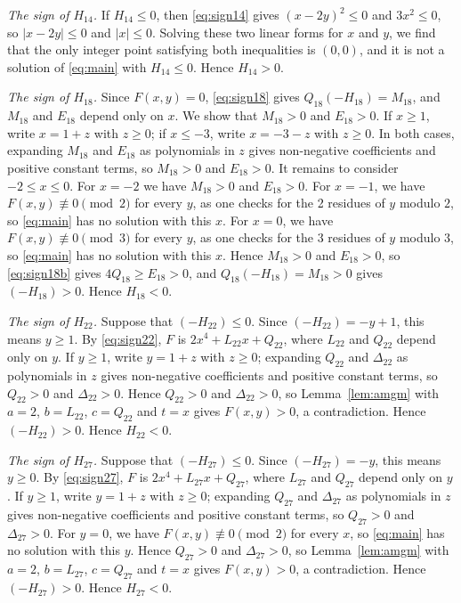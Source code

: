 \documentclass[11pt]{article}
\begin{document}
\emph{The sign of $H_{14}$.} If $H_{14}\leq0$, then \eqref{eq:sign14} gives $(x-2y)^2\leq 0$ and $3x^2\leq 0$, so $|x-2y|\leq0$ and $|x|\leq0$. Solving these two linear forms for $x$ and $y$, we find that the only integer point satisfying both inequalities is $(0,0)$, and it is not a solution of \eqref{eq:main} with $H_{14}\leq0$. Hence $H_{14}>0$.

\emph{The sign of $H_{18}$.} Since $F(x,y)=0$, \eqref{eq:sign18} gives $Q_{18}(-H_{18})=M_{18}$, and $M_{18}$ and $E_{18}$ depend only on $x$. We show that $M_{18}>0$ and $E_{18}>0$. If $x\geq1$, write $x=1+z$ with $z\geq0$; if $x\leq-3$, write $x=-3-z$ with $z\geq0$. In both cases, expanding $M_{18}$ and $E_{18}$ as polynomials in $z$ gives non-negative coefficients and positive constant terms, so $M_{18}>0$ and $E_{18}>0$. It remains to consider $-2\leq x\leq0$. For $x=-2$ we have $M_{18}>0$ and $E_{18}>0$. For $x=-1$, we have $F(x,y)\not\equiv0\pmod{2}$ for every $y$, as one checks for the 2 residues of $y$ modulo $2$, so \eqref{eq:main} has no solution with this $x$. For $x=0$, we have $F(x,y)\not\equiv0\pmod{3}$ for every $y$, as one checks for the 3 residues of $y$ modulo $3$, so \eqref{eq:main} has no solution with this $x$. Hence $M_{18}>0$ and $E_{18}>0$, so \eqref{eq:sign18b} gives $4Q_{18}\geq E_{18}>0$, and $Q_{18}(-H_{18})=M_{18}>0$ gives $(-H_{18})>0$. Hence $H_{18}<0$.

\emph{The sign of $H_{22}$.} Suppose that $(-H_{22})\leq0$. Since $(-H_{22})=-y+1$, this means $y\geq1$. By \eqref{eq:sign22}, $F$ is $2x^4+L_{22}x+Q_{22}$, where $L_{22}$ and $Q_{22}$ depend only on $y$. If $y\geq1$, write $y=1+z$ with $z\geq0$; expanding $Q_{22}$ and $\Delta_{22}$ as polynomials in $z$ gives non-negative coefficients and positive constant terms, so $Q_{22}>0$ and $\Delta_{22}>0$. Hence $Q_{22}>0$ and $\Delta_{22}>0$, so Lemma~\ref{lem:amgm} with $a=2$, $b=L_{22}$, $c=Q_{22}$ and $t=x$ gives $F(x,y)>0$, a contradiction. Hence $(-H_{22})>0$. Hence $H_{22}<0$.

\emph{The sign of $H_{27}$.} Suppose that $(-H_{27})\leq0$. Since $(-H_{27})=-y$, this means $y\geq0$. By \eqref{eq:sign27}, $F$ is $2x^4+L_{27}x+Q_{27}$, where $L_{27}$ and $Q_{27}$ depend only on $y$. If $y\geq1$, write $y=1+z$ with $z\geq0$; expanding $Q_{27}$ and $\Delta_{27}$ as polynomials in $z$ gives non-negative coefficients and positive constant terms, so $Q_{27}>0$ and $\Delta_{27}>0$. For $y=0$, we have $F(x,y)\not\equiv0\pmod{2}$ for every $x$, so \eqref{eq:main} has no solution with this $y$. Hence $Q_{27}>0$ and $\Delta_{27}>0$, so Lemma~\ref{lem:amgm} with $a=2$, $b=L_{27}$, $c=Q_{27}$ and $t=x$ gives $F(x,y)>0$, a contradiction. Hence $(-H_{27})>0$. Hence $H_{27}<0$.
\end{document}

